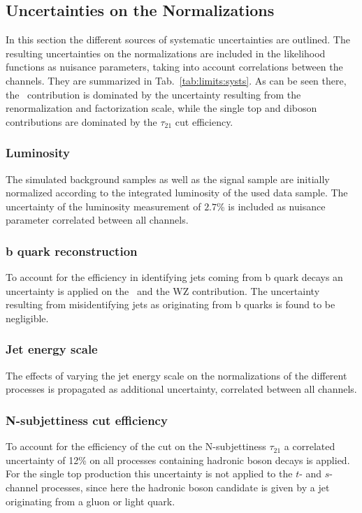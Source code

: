 \subsection*{Uncertainties on the Normalizations}
In this section the different sources  of systematic uncertainties are outlined. The resulting uncertainties on the normalizations are included in the likelihood functions as nuisance parameters, taking into account correlations between the channels. They are summarized in Tab.~\ref{tab:limits:systs}. As can be seen there, the \ttbar \ contribution is dominated by the uncertainty resulting from the renormalization and factorization scale, while the single top and diboson contributions are dominated by the $\tau_{21}$ cut efficiency.
\subsubsection*{Luminosity}
The simulated background samples as well as the signal sample are initially normalized according to the integrated luminosity of the used data sample. The uncertainty of the luminosity measurement of $2.7$\% is included as nuisance parameter correlated between all channels.
\subsubsection*{b quark reconstruction}
To account for the efficiency in identifying jets coming from b quark decays \cite{CSV2} an uncertainty is applied on the \ttbar \ and the WZ contribution. The uncertainty resulting from misidentifying jets as originating from b quarks is found to be negligible.
\subsubsection*{Jet energy scale}
The effects of varying the jet energy scale on the normalizations of the different processes is propagated as additional uncertainty, correlated between all channels.
\subsubsection*{N-subjettiness cut efficiency}
To account for the efficiency of the cut on the N-subjettiness $\tau_{21}$ a correlated uncertainty of 12\% on all processes containing hadronic boson decays is applied. For the single top production this uncertainty is not applied to the $t$- and $s$-channel processes, since here the hadronic boson candidate is given by a jet originating from a gluon or light quark.
